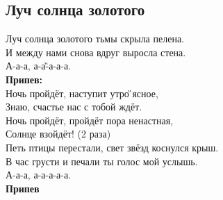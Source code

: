 \documentclass[fleqn,a5paper,12pt,twoside]{guitartabs}
\begin{document}
\subsection*{Луч солнца золотого}
    Л\C{}уч солнца золо\Em{}того ть\Am{}мы скрыла пелен\C{}а.\\
    \C{}И между нами с\Em{}нова вдр\F{}уг выросла стен\E{}а.\\
    А-а-\F{}а, а-а-\G{}а-а-а.\\ 

    \-\hspace{10mm}\textbf{Припев:}\\
    \-\hspace{10mm}\C{}Ночь пройдёт, наступит \F{}утро \G{}ясное,\\
    \-\hspace{10mm}Знаю, счастье нас с тобой ждёт. \\
    \-\hspace{10mm}Ночь пройдёт, пройдёт пора ненастная,\\
    \-\hspace{10mm}С\C{}олнце взойдёт! (2 раза)\\

    Петь птицы перестали, свет звёзд коснулся крыш.\\
    В час грусти и печали ты голос мой услышь.\\
    А-а-а, а-а-а-а-а. \\
 
   \-\hspace{10mm}\textbf{Припев}
\newpage
{}%
\end{document}
